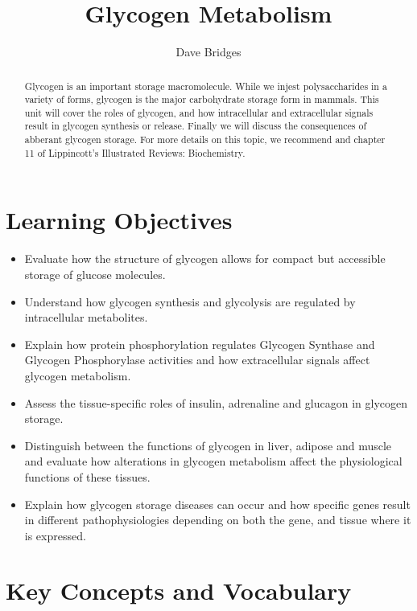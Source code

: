 \documentclass{tufte-handout}
\title{Glycogen Metabolism}
\author{Dave Bridges}
\date{}  %
\begin{document}
\maketitle%

\begin{abstract}
\noindent Glycogen is an important storage macromolecule.  While we injest polysaccharides in a variety of forms, glycogen is the major carbohydrate storage form in mammals.  This unit will cover the roles of glycogen, and how intracellular and extracellular signals result in glycogen synthesis or release.  Finally we will discuss the consequences of abberant glycogen storage.  For more details on this topic, we recommend \citet{Bollen1998} and chapter 11 of Lippincott's Illustrated Reviews: Biochemistry\cite{Ferrier2017}.
\end{abstract}

\tableofcontents
\pagebreak{}
\section{Learning Objectives}

\begin{itemize}
\item Evaluate how the structure of glycogen allows for compact but accessible storage of glucose molecules.
\item Understand how glycogen synthesis and glycolysis are regulated by intracellular metabolites.
\item Explain how protein phosphorylation regulates Glycogen Synthase and Glycogen Phosphorylase activities and how extracellular signals affect glycogen metabolism.
\item Assess the tissue-specific roles of insulin, adrenaline and glucagon in glycogen storage.
\item Distinguish between the functions of glycogen in liver, adipose and muscle and evaluate how alterations in glycogen metabolism affect the physiological functions of these tissues.
\item Explain how glycogen storage diseases can occur and how specific genes result in different pathophysiologies depending on both the gene, and tissue where it is expressed.
\end{itemize}

\section{Key Concepts and Vocabulary}
\end{document}
